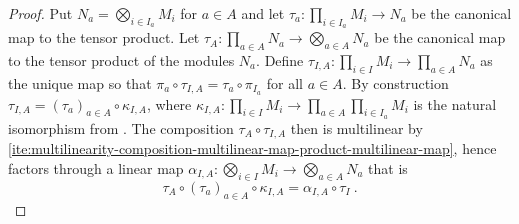 \begin{proof}
  Put $N_a = \bigotimes_{i \in I_a} M_i$  for  $a \in A$ and let
  $\tau_a :  \prod_{i \in I_a} M_i \to  N_a$ be the canonical map to the tensor product.
  Let $\tau_A :\prod_{a \in A}N_a \to \bigotimes_{a \in A} N_a$ be the canonical map to
  the tensor product of the modules $N_a$.
  Define $\tau_{I,A}: \prod_{i \in I} M_i\to \prod_{a \in A} N_a$ as the unique map so that
  $\pi_a  \circ \tau_{I,A} = \tau_a \circ \pi_{I_a}$  for all $a\in A$.
  By construction $\tau_{I,A} = (\tau_a)_{a\in A} \circ \kappa_{I,A}$,
  where $\kappa_{I,A} :  \prod_{i\in I} M_i \to \prod_{a \in A} \prod_{i \in I_a} M_i$ is the natural isomorphism from
  .  
  The composition $\tau_A \circ \tau_{I,A}$ then is multilinear by 
  \ref{ite:multilinearity-composition-multilinear-map-product-multilinear-map}, hence factors through a linear map
  $\alpha_{I,A} : \bigotimes_{i\in I} M_i \to \bigotimes_{a \in A} N_a$ 
  that is
  \begin{equation}\label{eq:defining-equation-associator-map-tensor-product}
    \tau_A \circ (\tau_a)_{a\in A} \circ \kappa_{I,A} =
    \alpha_{I,A} \circ \tau_I \ .
  \end{equation}  
     

\end{proof}

